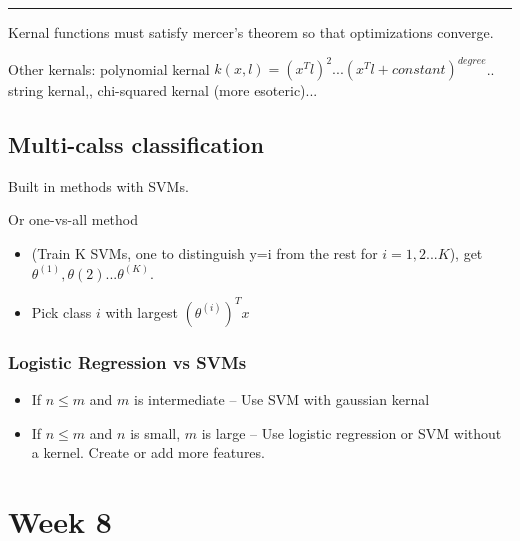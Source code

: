 \documentclass{article}
\begin{document}
\par\noindent\rule{\textwidth}{0.4pt}

Kernal functions must satisfy mercer's theorem so that optimizations converge.




Other kernals: polynomial kernal $k(x,l) = (x^T l)^2 ... (x^T l + constant)^{degree}$.. string kernal,, chi-squared kernal (more esoteric)...


\subsection{Multi-calss classification}

Built in methods with SVMs.

Or one-vs-all method 

\begin{itemize}
\item (Train K SVMs, one to distinguish y=i from the rest for $i = 1,2...K$), get $\theta^{(1)}, \theta{(2)}...\theta^{(K)}$. 

\item Pick class $i$ with largest $(\theta^{(i)})^T x$
\end{itemize}



\subsubsection{Logistic Regression vs SVMs}

\begin{itemize}
\itemIf $n \geq m$ (way more features than training examples, such as for email-spam) -- Use logistic regression or SVM without a kernal (Linear kernal), because not enough data for a complicated non-linear function.


\item If $n \leq m$ and $m$ is intermediate -- Use SVM with gaussian kernal 

\item If $n \leq m$ and $n$ is small, $m$ is large -- Use logistic regression or SVM without a kernel. Create or add more features.
\end{itemize}








\section{Week 8}
\end{document}
